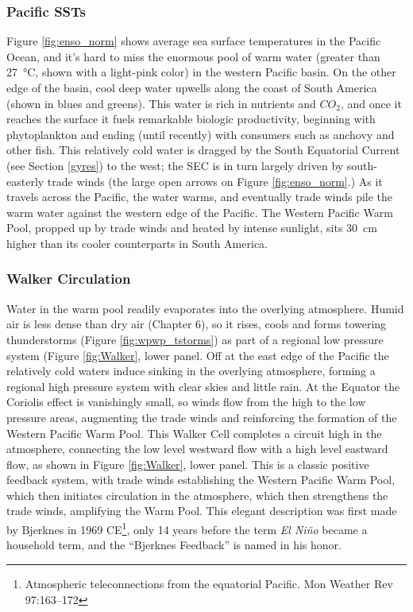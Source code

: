 \documentclass[amstex,12pt]{book}
\begin{document}
{\subsubsection{Pacific SSTs}
Figure \ref{fig:enso_norm} shows average sea surface temperatures in the Pacific Ocean, and it's hard to miss the enormous pool of warm water (greater than \SI{27}{\celsius}, shown with a light-pink color) in the western Pacific basin. On the other edge of the basin, cool deep water upwells along the coast of South America (shown in blues and greens). This water is rich in nutrients and $CO_2$, and once it reaches the surface it fuels remarkable biologic productivity, beginning with phytoplankton and ending (until recently) with consumers such as anchovy and other fish. This relatively cold water is dragged by the South Equatorial Current (see Section \ref{gyres}) to the west; the SEC is in turn largely driven by south-easterly trade winds (the large open arrows on Figure \ref{fig:enso_norm}.) As it travels across the Pacific, the water warms, and eventually trade winds pile the warm water against the western edge of the Pacific. The Western Pacific Warm Pool, propped up by trade winds and heated by intense sunlight, sits \SI{30}{\centi\metre} higher than its cooler counterparts in South America.  
\subsubsection{Walker Circulation}
Water in the warm pool readily evaporates into the overlying atmosphere. Humid air is less dense than dry air (Chapter 6), so it rises, cools and forms towering thunderstorms (Figure \ref{fig:wpwp_tstorms}) as part of a regional low pressure system (Figure \ref{fig:Walker}, lower panel.  Off at the east edge of the Pacific the relatively cold waters induce sinking in the overlying atmosphere, forming a regional high pressure system with clear skies and little rain. At the Equator the Coriolis effect is vanishingly small, so winds flow from the high to the low pressure areas, augmenting the trade winds and reinforcing the formation of the Western Pacific Warm Pool. This Walker Cell completes a circuit high in the atmosphere, connecting the low level westward flow with a high level eastward flow, as shown in Figure \ref{fig:Walker}, lower panel. This is a classic positive feedback system, with trade winds establishing the Western Pacific Warm Pool, which then initiates circulation in the atmosphere, which then strengthens the trade winds, amplifying the Warm Pool. This elegant description was first made by Bjerknes in 1969 CE\footnote{Atmospheric teleconnections from the equatorial Pacific. Mon Weather Rev 97:163–172}, only 14 years before the term \textit{El Ni\~no} became a household term, and the ``Bjerknes Feedback'' is named in his honor.
}
\end{document}

